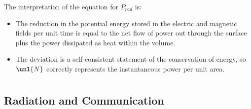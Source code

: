 \documentclass[a4paper, 11pt, normalem]{report}
\begin{document}
The interpretation of the equation for $P_{rad}$ is:
\begin{itemize}
	\item The reduction in the potential energy stored in the electric and magnetic fields per unit time is equal to the net flow of power out through the surface plus the power dissipated as heat within the volume.
	\item The deviation is a self-consistent statement of the conservation of energy, so $\unl{N}$ correctly represents the instantaneous power per unit area.
\end{itemize}

\chapter{}
\section{Radiation and Communication}
\end{document}
